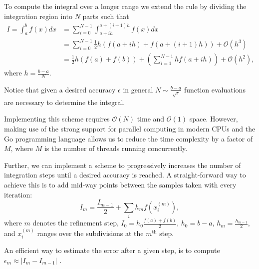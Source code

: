 \documentclass[10pt, a4paper]{article}
\begin{document}
  To compute the integral over a longer range we extend the rule by dividing the integration
  region into $N$ parts such that
  \begin{equation}
  \begin{split}
  I = \int_a^b f(x) dx & = \sum_{i=0}^{N-1} \int_{a+ih}^{a+(i+1)h} f(x) dx \\
  & = \sum_{i=0}^{N-1} \frac{1}{2} h (f(a+ih) + f(a+(i+1)h)) + \mathcal{O}(h^3) \\
  & = \frac{1}{2} h (f(a) + f(b)) + \left( \sum_{i=1}^{N-1} h f(a+ih) \right) + \mathcal{O}(h^2),
  \end{split}
  \end{equation}
  where $h = \frac{b-a}{N}$.

  Notice that given a desired accuracy $\epsilon$ in general $N \sim \frac{b-a}{\sqrt{\epsilon}}$
  function evaluations are necessary to determine the integral.

  Implementing this scheme requires $\mathcal{O}(N)$ time and $\mathcal{O}(1)$ space. However, making
  use of the strong support for parallel computing in modern CPUs and the Go programming language allows
  us to reduce the time complexity by a factor of $M$, where $M$ is the number of threads
  running concurrently\footnotemark.


  Further, we can implement a scheme to progressively increases the number of integration steps until
  a desired accuracy is reached. A straight-forward way to achieve this is to add mid-way points
  between the samples taken with every iteration:
  \begin{equation}
  \label{eq:trap-rec}
  I_m = \frac{I_{m-1}}{2} + \sum_i h_m f(x^{(m)}_i),
  \end{equation}
  where $m$ denotes the refinement step, $I_0 = h_0\frac{f(a) + f(b)}{2}$, $h_0 = b-a$,
  $h_m = \frac{h_{m-1}}{2}$, and $x^{(m)}_i$
  ranges over the subdivisions at the $m^{\text{th}}$ step.

  An efficient way to estimate the error after a given step, is to compute $\epsilon_m \approx |I_m - I_{m-1}|$
  \cite{nr}.
\end{document}
